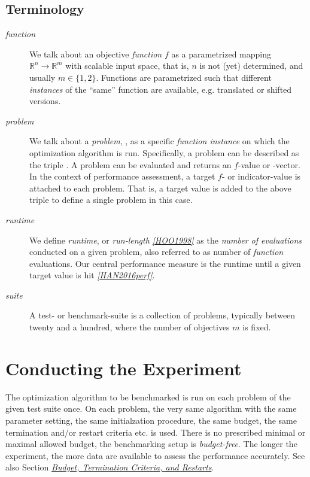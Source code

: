 \documentclass[letterpaper,12pt,english]{article}
\begin{document}
\subsection{Terminology}
\label{index:terminology}\begin{description}
\item[{\emph{function}}] \leavevmode
We talk about an objective \emph{function} \(f\) as a parametrized mapping
\(\mathbb{R}^n\to\mathbb{R}^m\) with scalable input space, that is,
\(n\) is not (yet) determined, and usually \(m\in\{1,2\}\).
Functions are parametrized such that different \emph{instances} of the
``same'' function are available, e.g. translated or shifted versions.

\item[{\emph{problem}}] \leavevmode
We talk about a \emph{problem}, \href{http://numbbo.github.io/coco-doc/C/coco\_8h.html\#a408ba01b98c78bf5be3df36562d99478}{}, as a specific \emph{function
instance} on which the optimization algorithm is run. Specifically, a problem
can be described as the triple . A problem
can be evaluated and returns an \(f\)-value or -vector.
In the context of performance
assessment, a target \(f\)- or indicator-value
is attached to each problem. That is, a target value is added to the
above triple to define a single problem in this case.

\item[{\emph{runtime}}] \leavevmode
We define \emph{runtime}, or \emph{run-length} \label{index:id8}{\hyperref[index:hoo1998]{\emph{{[}HOO1998{]}}}}
as the \emph{number of evaluations}
conducted on a given problem, also referred to as number of \emph{function} evaluations.
Our central performance measure is the runtime until a given target value
is hit \label{index:id9}{\hyperref[index:han2016perf]{\emph{{[}HAN2016perf{]}}}}.

\item[{\emph{suite}}] \leavevmode
A test- or benchmark-suite is a collection of problems, typically between
twenty and a hundred, where the number of objectives \(m\) is fixed.

\end{description}


\section{Conducting the Experiment}
\label{index:conducting-the-experiment}
The optimization algorithm to be benchmarked is run on each problem of the
given test suite once. On each problem, the very same algorithm with the same
parameter setting, the same initialzation procedure, the same budget, the same
termination and/or restart criteria etc. is used.
There is no prescribed minimal or maximal allowed budget, the benchmarking
setup is \emph{budget-free}.
The longer the experiment, the more data are available to assess the performance
accurately.
See also Section {\hyperref[index:sec\string-budget]{\emph{Budget, Termination Criteria, and Restarts}}}.
\end{document}
